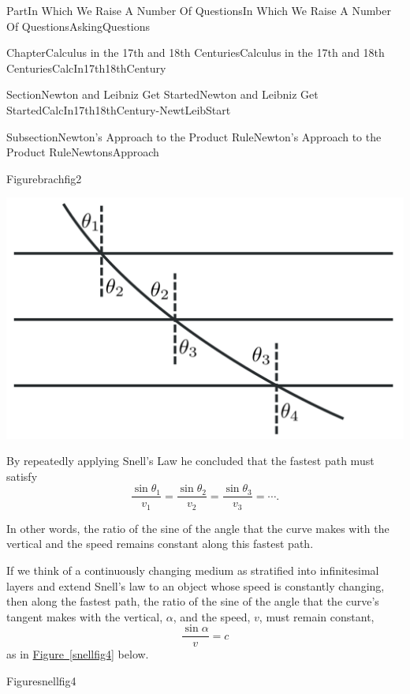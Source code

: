 \documentclass[oneside,10pt,]{book}
\newcommand{\xreffont}{\relax}
\numberwithin{equation}{part}
\begin{document}
\begin{partptx}{Part}{In Which We Raise A Number Of Questions}{}{In Which We Raise A Number Of Questions}{}{}{AskingQuestions}
\begin{chapterptx}{Chapter}{Calculus in the 17th and 18th Centuries}{}{Calculus in the 17th and 18th Centuries}{}{}{CalcIn17th18thCentury}
\begin{sectionptx}{Section}{Newton and Leibniz Get Started}{}{Newton and Leibniz Get Started}{}{}{CalcIn17th18thCentury-NewtLeibStart}
\begin{subsectionptx}{Subsection}{Newton's Approach to the Product Rule}{}{Newton's Approach to the Product Rule}{}{}{NewtonsApproach}
\begin{figureptx}{Figure}{}{brachfig2}{}
\begin{image}{0.225}{0.55}{0.225}{}
\includegraphics[width=\linewidth]{external/images/brachfig2-1.png}
\end{image}%
\tcblower
\end{figureptx}%
By repeatedly applying Snell's Law he concluded that the fastest path must satisfy%
\begin{equation*}
\frac{\sin \theta_1}{v_1}=\frac{\sin \theta_2}{v_2}=\frac{\sin\theta_3}{v_3}=\cdots\text{.}
\end{equation*}
%
\par
In other words, the ratio of the sine of the angle that the curve makes with the vertical and the speed remains constant along this fastest path.%
\par
If we think of a continuously changing medium as stratified into infinitesimal layers and extend Snell's law to an object whose speed is constantly changing, then along the fastest path, the ratio of the sine of the angle that the curve's tangent makes with the vertical, \(\alpha\), and the speed, \(v\), must remain constant,%
\begin{equation*}
\frac{\sin\alpha}{v}=c
\end{equation*}
as in \hyperref[snellfig4]{Figure~{\xreffont\ref{snellfig4}}} below.%
\begin{figureptx}{Figure}{}{snellfig4}{}%
\begin{image}{0.3}{0.4}{0.3}{}%

\end{image}
\end{figureptx}
\end{subsectionptx}
\end{sectionptx}
\end{chapterptx}
\end{partptx}
\end{document}
